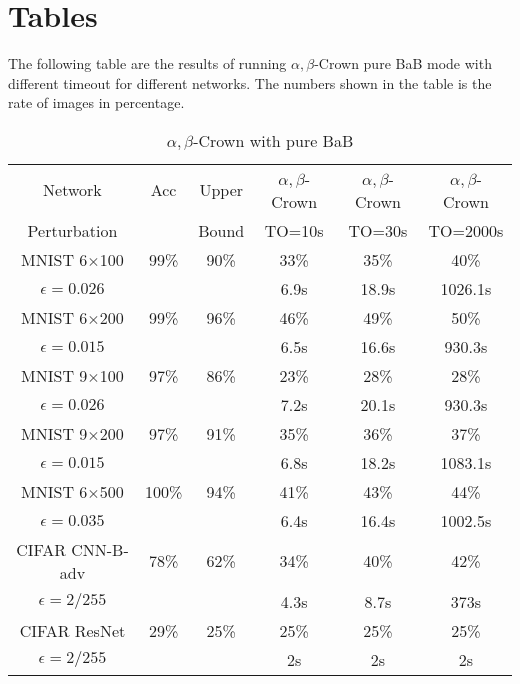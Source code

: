 \section*{Tables}

The following table are the results of running $\alpha,\beta$-Crown pure BaB mode with different timeout for different networks. The numbers shown in the table is the rate of images in percentage.

\begin{table}
	\centering
	\caption{$\alpha,\beta$-Crown with pure BaB}
	\label{table_beta}
	\begin{tabular}{||c|c|c||c|c|c||}
		\hline
		Network & Acc & Upper  & $\alpha,\beta$-Crown& $\alpha,\beta$-Crown & $\alpha,\beta$-Crown \\ 
		Perturbation &   & Bound & TO=10s & TO=30s & TO=2000s\\ \hline
		
		MNIST 6$\times$100 & 99\% & 90\% & 33\% & 35\% & 40\%   \\
		$\epsilon = 0.026$ &  &  & 6.9s &  18.9s &  1026.1s  \\  \hline
		MNIST 6$\times$200 & 99\%  & 96\%  & 46\%  & 49\%  & 50\%   \\ 
		$\epsilon = 0.015$ & &  & 6.5s &  16.6s &  930.3s  \\  \hline
		MNIST 9$\times$100 & 97\%  & 86\%  & 23\%  & 28\%  & 28\%   \\
		$\epsilon = 0.026$ &  &  & 7.2s &  20.1s &  930.3s  \\  \hline
		MNIST 9$\times$200 & 97\%  & 91\%  & 35\%  & 36\%  & 37\%   \\ 
		$\epsilon = 0.015$ & &  & 6.8s &  18.2s &  1083.1s  \\  \hline
		MNIST 6$\times$500 & 100\%  & 94\%  & 41\%  & 43\%  & 44\%   \\ 
		$\epsilon = 0.035$ & &  & 6.4s &  16.4s &  1002.5s  \\  \hline
		CIFAR CNN-B-adv & 78\%  & 62\%  &  34\% & 40\%  & 42\%   \\
		$\epsilon = 2/255$&  &  & 4.3s & 8.7s & 373s  \\ \hline \hline
		CIFAR ResNet & 29\%  & 25\%  & 25\%  & 25\%  & 25\%   \\
		$\epsilon = 2/255$ &  &  & 2s & 2s & 2s  \\ \hline
	\end{tabular}
\end{table}


\vspace*{4ex}


